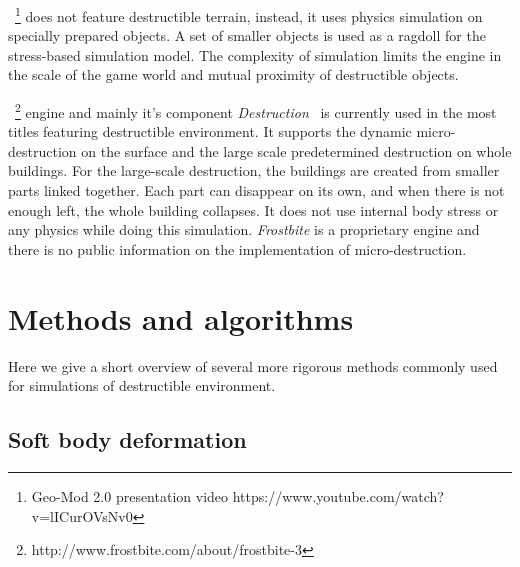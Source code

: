 ~\cite{geomod}\footnote{Geo-Mod 2.0 presentation video https://www.youtube.com/watch?v=lICurOVsNv0} does not feature destructible terrain, instead, it uses physics simulation on specially prepared objects. A set of smaller objects is used as a ragdoll for the stress-based simulation model. The complexity of simulation limits the engine in the scale of the game world and mutual proximity of destructible objects.


~\footnote{http://www.frostbite.com/about/frostbite-3} engine and mainly it's component \emph{Destruction}~\cite{destruction} is currently used in the most titles featuring destructible environment. It supports the dynamic micro-destruction on the surface and the large scale predetermined destruction on whole buildings. For the large-scale destruction, the buildings are created from smaller parts linked together. Each part can disappear on its own, and when there is not enough left, the whole building collapses. It does not use internal body stress or any physics while doing this simulation. \emph{Frostbite} is a proprietary engine and there is no public information on the implementation of micro-destruction.

\section{Methods and algorithms}

Here we give a short overview of several more rigorous methods commonly used for simulations of destructible environment.

\subsection{Soft body deformation}


